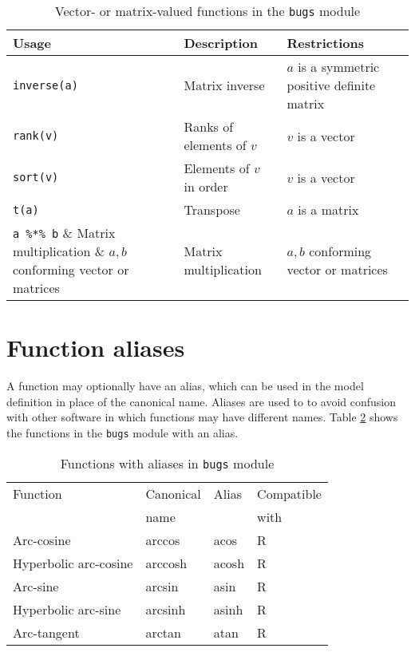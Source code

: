 \documentclass[11pt, a4paper, titlepage]{report}
\begin{document}
\begin{table}
\begin{center}
\begin{tabular}{lll}
\hline
Usage & Description & Restrictions \\
\hline
\verb+inverse(a)+ & Matrix inverse & $a$ is a symmetric positive definite matrix  \\
\verb+rank(v)+ & Ranks of elements of $v$ & $v$ is a vector   \\
\verb+sort(v)+ & Elements of $v$ in order & $v$ is a vector  \\
\verb+t(a)+    & Transpose                & $a$ is a matrix \\
\verb+a %*% b+  & Matrix multiplication & $a,b$ conforming vector or matrices\\

\hline
\end{tabular}
\caption{Vector- or matrix-valued functions in the \texttt{bugs}
  module \label{table:bugs:vector}}
\end{center}
\end{table}

\section{Function aliases}

A function may optionally have an alias, which can be used in the
model definition in place of the canonical name. Aliases are used to
to avoid confusion with other software in which functions may have
different names. Table \ref{table:bugs:functions:alias} shows the
functions in the \texttt{bugs} module with an alias.

\begin{table}
\begin{center}
\begin{tabular}{llll}
\hline
Function               & Canonical & Alias & Compatible  \\
                       & name      &       & with         \\
\hline
Arc-cosine             & arccos    & acos  & R \\
Hyperbolic arc-cosine  & arccosh   & acosh & R \\
Arc-sine               & arcsin    & asin  & R \\
Hyperbolic arc-sine    & arcsinh   & asinh & R \\
Arc-tangent            & arctan    & atan  & R \\
\hline
\end{tabular}
\caption{Functions with aliases in \texttt{bugs} module
  \label{table:bugs:functions:alias}}
\end{center}
\end{table}
\end{document}
